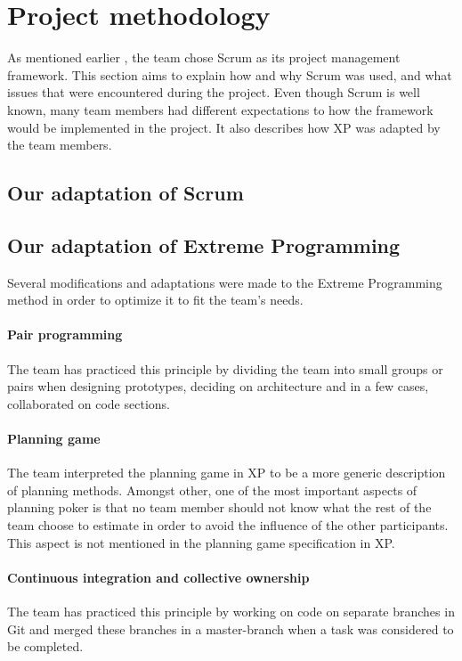 \section{Project methodology}
As mentioned earlier , the team chose Scrum as its project management framework. This section aims to explain how and why Scrum was used, and what issues that were encountered during the project. Even though Scrum is well known, many team members had different expectations to how the framework would be implemented in the project. It also describes how XP was adapted by the team members.

\subsection{Our adaptation of Scrum}


\subsection{Our adaptation of Extreme Programming}
Several modifications and adaptations were made to the Extreme Programming method in order to optimize it to fit the team's needs.

\paragraph{Pair programming}
The team has practiced this principle by dividing the team into small groups or pairs when designing prototypes, deciding on architecture and in a few cases, collaborated on code sections.

\paragraph{Planning game}
The team interpreted the planning game in XP to be a more generic description of planning methods.  Amongst other, one of the most important aspects of planning poker is that no team member should not know what the rest of the team choose to estimate in order to avoid the influence of the other participants. This aspect is not mentioned in the planning game specification in XP.

\paragraph{Continuous integration and collective ownership}
The team has practiced this principle by working on code on separate branches in Git and merged these branches in a master-branch when a task was considered to be completed.

